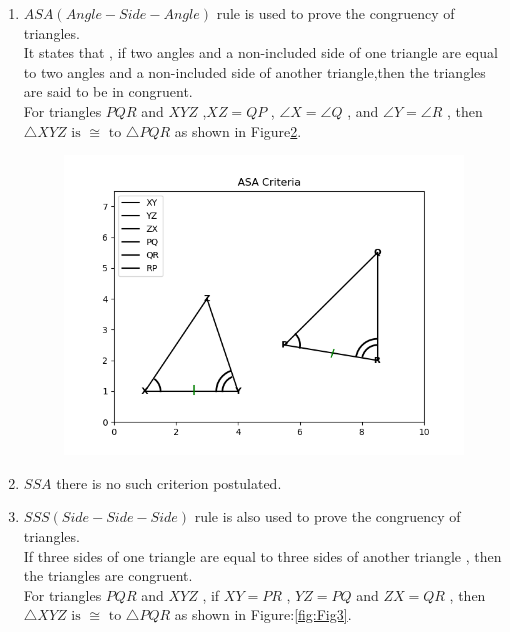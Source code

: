 \documentclass[12pt]{article}
\begin{document}
\begin{enumerate}
\begin{figure}[!h]
\begin{center}
  \end{center}
\caption{}
\label{fig:Fig2}
\end{figure}
\pagebreak
\item $ASA(Angle-Side-Angle)$ rule is used to prove the congruency of triangles.\\
It states that , if two angles and a non-included side of one triangle are equal to two angles and a non-included side of another triangle,then the triangles are said to be in congruent.\\
		For triangles $PQR$ and $XYZ$ ,$XZ = QP$ , $ \angle X = \angle Q$ , and $\angle Y = \angle R$ , then $\triangle XYZ \text{ is } \cong \text{ to }  \triangle PQR$ as shown in Figure\ref{fig:Fig1}.
		\begin{figure}[!h]
  \begin{center} 
      \includegraphics[width=\columnwidth]{./figs/graph1.png}
  \end{center}
\caption{}
\label{fig:Fig1}
\end{figure}
\pagebreak
\item $SSA$ there is no such criterion postulated.
\item $SSS(Side-Side-Side)$ rule is also used to prove the congruency of triangles.\\
	If three sides of one triangle are equal to three sides of another triangle , then the triangles are congruent.\\
For triangles $PQR$ and $XYZ$ , if $XY = PR$ , $YZ = PQ$ and $ZX = QR$ , then $\triangle XYZ \text{ is } \cong \text{ to }  \triangle PQR$ as shown in Figure:\ref{fig:Fig3}.
\begin{figure}[!h]

\end{figure}
\end{enumerate}
\end{document}
